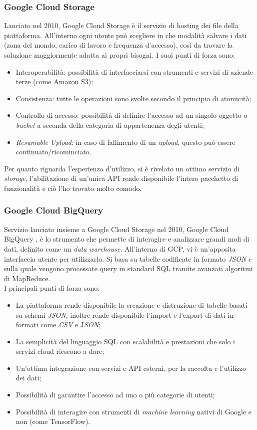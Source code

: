 \subsubsection{Google Cloud Storage}
Lanciato nel 2010, Google Cloud Storage è il servizio di hosting dei file della piattaforma. All'interno ogni utente può scegliere in che modalità salvare i dati (zona del mondo, carico di lavoro e frequenza d'accesso), così da trovare la soluzione maggiormente adatta ai propri bisogni.
I suoi punti di forza sono:
\begin{itemize}
	\item Interoperabilità: possibilità di interfacciarsi con strumenti e servizi di aziende terze (come Amazon S3);
	\item Consistenza: tutte le operazioni sono svolte secondo il principio di \gls{atomicità};
	\item Controllo di accesso: possibilità di definire l'accesso ad un singolo oggetto o \emph{\gls{bucket}} a seconda della categoria di appartenenza degli utenti;
	\item \emph{Resumable Upload}: in caso di fallimento di un \emph{upload}, questo può essere continuato/ricominciato.
\end{itemize}

Per quanto riguarda l'esperienza d'utilizzo, si è rivelato un ottimo servizio di \emph{storage}, l'abilitazione di un'unica API rende disponibile l'intero pacchetto di funzionalità e ciò l'ho trovato molto comodo.
\subsubsection{Google Cloud BigQuery}
Servizio lanciato insieme a Google Cloud Storage nel 2010, Google Cloud BigQuery , è lo strumento che permette di interagire e analizzare grandi moli di dati, definito come un \emph{\gls{data warehouse}}. All'interno di GCP, vi è un'apposita interfaccia utente per utilizzarlo. Si basa su tabelle codificate in formato \emph{JSON} e sulla quale vengono processate query in standard SQL \cite{standardSQL} tramite avanzati algoritmi di \Gls{MapReduce}.
\\I principali punti di forza sono:
\begin{itemize}
	\item La piattaforma rende disponibile la creazione e distruzione di tabelle basati su schemi \emph{JSON}, inoltre rende disponibile l'import e l'export di dati in formati come \emph{CSV} e J\emph{SON};
	\item La semplicità del linguaggio SQL con scalabilità e prestazioni che solo i servizi cloud riescono a dare;
	\item Un'ottima integrazione con servizi e API esterni, per la raccolta e l'utilizzo dei dati;
	\item Possibilità di garantire l'accesso ad uno o più categorie di utenti;
	\item Possibilità di interagire con strumenti di \emph{machine learning} nativi di Google e non (come TensorFlow).
\end{itemize}

